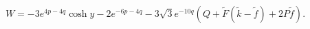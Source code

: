 \begin{equation}
W=-3e^{4p-4q}\cosh y -2e^{-6p-4q}-3\sqrt{3}e^{-10q}\left (Q+\tilde F(\tilde k-\tilde f)+2P\tilde f\right ).
\label{superpo}
\end{equation} 

